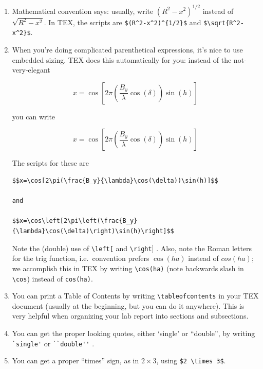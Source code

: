 \documentclass[12pt,preprint]{aastex}
\begin{document}
\begin{enumerate}

	\item Mathematical convention says: usually, write
$(R^2-x^2)^{1/2}$ instead of $\sqrt{R^2-x^2}$.  In TEX, the scripts are
\verb&$(R^2-x^2)^{1/2}$& and \verb&$\sqrt{R^2-x^2}$&. 

	\item When you're doing complicated parenthetical expressions,
it's nice to use embedded sizing. TEX does this automatically for you:
instead of the not-very-elegant

$$x=\cos[2\pi(\frac{B_y}{\lambda}\cos(\delta))\sin(h)]$$

\noindent you can write

$$x=\cos\left[2\pi\left(\frac{B_y}{\lambda}\cos(\delta)\right)\sin(h)\right]$$

\noindent The scripts for these are

\begin{verbatim} 
$$x=\cos[2\pi(\frac{B_y}{\lambda}\cos(\delta))\sin(h)]$$

and

$$x=\cos\left[2\pi\left(\frac{B_y}{\lambda}\cos(\delta)\right)\sin(h)\right]$$
\end{verbatim}

\noindent Note the (double) use of \verb$\left[$ and \verb$\right$] . 
Also, note the Roman letters for the trig function, i.e.\ convention
prefers $\cos(ha)$ instead of $cos(ha)$; we accomplish this in TEX by
writing \verb$\cos(ha)$ (note backwards slash in \verb$\cos$) instead of
\verb$cos(ha)$. 

\item You can print a Table of Contents by writing
\verb$\tableofcontents$ in your TEX document (usually at the beginning,
but you can do it anywhere). This is very helpful when
organizing your lab report into sections and subsections.

\item You can get the proper looking quotes, either `single' or
``double'', by writing \verb$`single'$ or \verb$``double''$ . 

\item You can get a proper ``times'' sign, as in $2 \times 3$, using
\verb=$2 \times 3$=. 


\end{enumerate}
\end{document}
